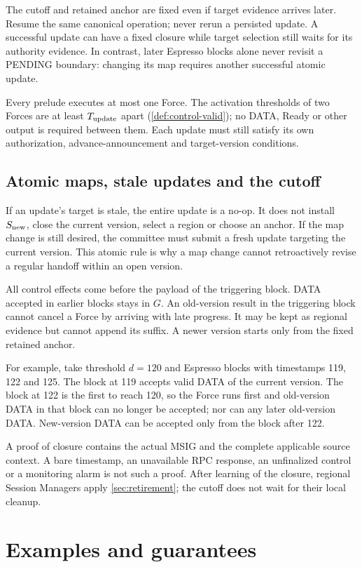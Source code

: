 \documentclass[11pt,a4paper]{article}
\begin{document}
The cutoff and retained anchor are fixed even if target evidence arrives
later. Resume the same canonical operation; never rerun a persisted
update. A successful update can have a fixed closure while target
selection still waits for its authority evidence. In contrast, later
Espresso blocks alone never revisit a PENDING boundary: changing its map
requires another successful atomic update.

Every prelude executes at most one Force. The activation thresholds of
two Forces are at least $T_{\rm update}$ apart
(\cref{def:control-valid}); no DATA, Ready or other output is required
between them.
Each update must still satisfy its own authorization,
advance-announcement and target-version conditions.

\subsection{Atomic maps, stale updates and the cutoff}
If an update's target is stale, the entire update is a no-op. It does not
install $S_{\rm new}$, close the current version, select a region or
choose an anchor. If the map change is still desired, the committee must
submit a fresh update targeting the current version. This atomic rule is
why a map change cannot retroactively revise a regular handoff within an
open version.

All control effects come before the payload of the triggering block.
DATA accepted in earlier blocks stays in $G$. An old-version result in
the triggering block cannot cancel a Force by arriving with late
progress. It may be kept as regional evidence but cannot append its
suffix. A newer version starts only from the fixed retained anchor.

For example, take threshold $d=120$ and Espresso blocks with timestamps
119, 122 and 125. The block at 119 accepts valid DATA of the current
version. The block at 122 is the first to reach 120, so the Force runs
first and old-version DATA in that block can no longer be accepted;
nor can any later old-version DATA. New-version DATA can be accepted only
from the block after 122.

A proof of closure contains the actual MSIG and the complete applicable
source context. A bare timestamp, an unavailable RPC response, an
unfinalized control or a monitoring alarm is not such a proof. After
learning of the closure, regional Session Managers apply
\cref{sec:retirement}; the cutoff does not wait for their local cleanup.

\section{Examples and guarantees}
\label{sec:examples}
\end{document}
